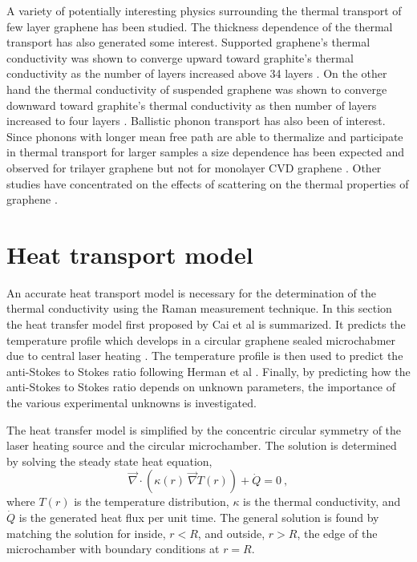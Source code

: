 A variety of potentially interesting physics surrounding the thermal transport of few layer graphene has been studied.
The thickness dependence of the thermal transport has also generated some interest.
Supported graphene's thermal conductivity was shown to converge upward toward graphite's thermal conductivity as the number of layers increased above 34 layers \cite{Sadeghi2013}.
On the other hand the thermal conductivity of suspended graphene was shown to converge downward toward graphite's thermal conductivity as then number of layers increased to four layers \cite{Ghosh2010}.
Ballistic phonon transport has also been of interest.
Since phonons with longer mean free path are able to thermalize and participate in thermal transport for larger samples a size dependence has been expected and observed for trilayer graphene \cite{Wang2010} but not for monolayer CVD graphene \cite{Chen2011a}.
Other studies have concentrated on the effects of scattering on the thermal properties of graphene \cite{Wang2010,Pettes2011,Jang2013,Chen2012}.

\section{Heat transport model}
An accurate heat transport model is necessary for the determination of the thermal conductivity using the Raman measurement technique.
In this section the heat transfer model first proposed by Cai et al is summarized.
It predicts the temperature profile which develops in a circular graphene sealed microchabmer due to central laser heating \cite{Cai2010}.
The temperature profile is then used to predict the anti-Stokes to Stokes ratio following Herman et al \cite{Herman2011}.
Finally, by predicting how the anti-Stokes to Stokes ratio depends on unknown parameters, the importance of the various experimental unknowns is investigated.

The heat transfer model is simplified by the concentric circular symmetry of the laser heating source and the circular microchamber.
The solution is determined by solving the steady state heat equation,
\begin{equation*}
	\vec{\nabla} \cdot \left(\kappa(r) \ \vec{\nabla} T(r) \right) + \dot{Q}=0 \ ,
	\label{eq:therm:heateq}
\end{equation*}
where $T(r)$ is the temperature distribution, $\kappa$ is the thermal conductivity, and $\dot{Q}$ is the generated heat flux per unit time.
The general solution is found by matching the solution for inside, $r<R$, and outside, $r>R$, the edge of the microchamber with boundary conditions at $r=R$.

